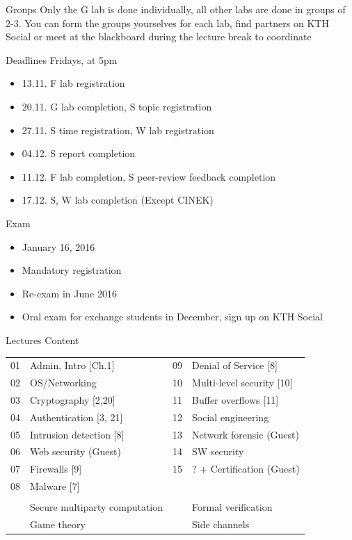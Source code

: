 \documentclass{beamer}
\begin{document}
\begin{frame}{Groups}
 Only the G lab is done individually, all other labs
are done in groups of 2-3. You can form the
groups yourselves for each lab, find partners on
KTH Social or meet at the blackboard during the
lecture break to coordinate
\end{frame}

\begin{frame}{Deadlines}
  Fridays, at 5pm
  \begin{itemize}
    \item 13.11. F lab registration
    \item 20.11. G lab completion, S topic registration
    \item 27.11. S time registration, W lab registration
    \item 04.12. S report completion
    \item 11.12. F lab completion, S peer-review feedback completion
    \item 17.12. S, W lab completion (Except CINEK)
  \end{itemize}
\end{frame}


\begin{frame}{Exam}
  \begin{itemize}
  \item January 16, 2016
  \item \alert{Mandatory} registration 
  \item Re-exam in June 2016
  \item Oral exam for exchange students in December,
    sign up on KTH Social
  \end{itemize}
\end{frame}

\begin{frame}{Lectures Content}
  \begin{tabular}{cl|cl}
    01 & Admin, Intro [Ch.1] &         09 & Denial of Service [8] \\
    02 & OS/Networking  &              10 & Multi-level security [10] \\
    03 & Cryptography [2,20] &         11 & Buffer overflows [11] \\
    04 & Authentication [3, 21] &      12 & Social engineering \\
    05 & Intrusion detection [8] &     13 & Network forensic (Guest) \\
    06 & Web security (Guest) &        14 & SW security \\
    07 & Firewalls [9]  &              15 & ? + Certification (Guest) \\
    08 & Malware [7] \\
    & & &\\
    & Secure multiparty computation & & Formal verification\\
    & Game theory & & Side channels
  \end{tabular}
\end{frame}
\end{document}

